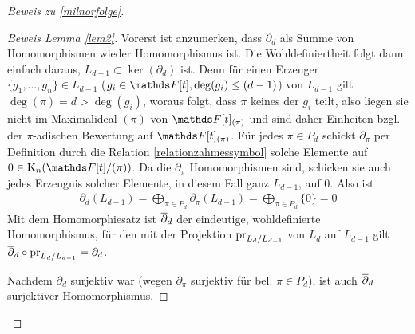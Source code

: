 \documentclass[ngerman,fontsize=11pt, paper=a4, parskip=half, titlepage=true, toc=bib]{scrartcl}
\begin{document}
\begin{proof}[Beweis zu \ref{milnorfolge}]
\begin{proof}[Beweis Lemma \ref{lem2}]
    Vorerst ist anzumerken, dass $\partial_d$ als Summe von
    Homomorphismen wieder Homomorphismus ist.
    Die Wohldefiniertheit folgt dann einfach daraus, $L_{d-1}\subset
    \ker(\partial_d)$ ist.
    Denn für einen Erzeuger
    $\{g_1,\dotsc,g_n\}\in L_{d-1}$ ($g_i\in\F[t],\deg(g_i)\leq (d-1)$)
    von $L_{d-1}$  gilt $\deg(\pi)=d>\deg(g_i)$, 
    woraus folgt, dass $\pi$ keines der $g_i$
    teilt, also liegen sie nicht im Maximalideal $(\pi)$ von
    $\F[t]_{(\pi)}$ und sind daher Einheiten bzgl. der $\pi$-adischen
    Bewertung auf $\F[t]_{(\pi)}$. Für jedes $\pi\in P_d$ schickt
    $\partial_\pi$ per Definition durch die Relation 
    \ref{relationzahmessymbol} solche Elemente auf $0\in\KnFtpi$.
    Da die $\partial_\pi$ Homomorphismen sind, schicken sie auch jedes
    Erzeugnis solcher Elemente, in diesem Fall ganz $L_{d-1}$, auf $0$.
    Also ist 
    \begin{gather*}
      \partial_d(L_{d-1})=\bigoplus_{\pi\in
        P_d}\partial_{\pi}(L_{d-1})=\bigoplus_{\pi\in P_d} \{0\}=0
    \end{gather*}
    Mit dem Homomorphiesatz ist $\overline\partial_d$ der eindeutige,
    wohldefinierte Homomorphismus, für den mit der Projektion
    $\operatorname{pr}_{L_d/L_{d-1}}$ von $L_d$ auf $L_{d-1}$ gilt
    $\overline\partial_d\circ \operatorname{pr}_{L_d/L_{d-1}}=\partial_d$.
    
    Nachdem $\partial_d$ surjektiv war (wegen $\partial_\pi$ surjektiv
    für bel. $\pi\in P_d$), ist auch $\overline\partial_d$
    surjektiver Homomorphismus.
    

    

\end{proof}
\end{proof}
\end{document}
